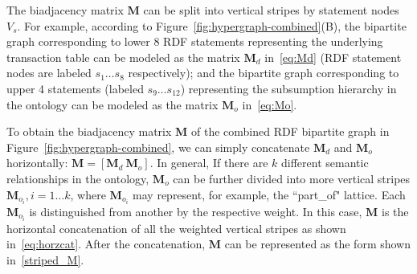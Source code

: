 The biadjacency matrix $\mathbf{M}$ can be split into vertical stripes by statement nodes $V_s$. For example, according to Figure~\ref{fig:hypergraph-combined}(B), the bipartite graph corresponding to lower 8 RDF statements representing the underlying transaction table can be modeled as the matrix $\mathbf{M}_d$ in~\ref{eq:Md} (RDF statement nodes are labeled $s_1\dots s_8$ respectively); and the bipartite graph corresponding to upper 4 statements (labeled $s_9\dots s_{12}$) representing the subsumption hierarchy in the ontology can be modeled as the matrix $\mathbf{M}_o$ in~\ref{eq:Mo}.

To obtain the biadjacency matrix $\mathbf{M}$ of the combined RDF bipartite graph in Figure~\ref{fig:hypergraph-combined}, we can simply concatenate $\mathbf{M}_d$ and $\mathbf{M}_o$ horizontally: $\mathbf{M}=\left[\mathbf{M}_d~\mathbf{M}_o\right]$. In general, If there are $k$ different semantic relationships in the ontology, $\mathbf{M}_o$ can be further divided into more vertical stripes $\mathbf{M}_{o_i}, i=1\dots k$, where $\mathbf{M}_{o_i}$ may represent, for example, the ``part\_of" lattice. Each $\mathbf{M}_{o_i}$ is  distinguished from another by the respective weight. In this case, $\mathbf{M}$ is the horizontal concatenation of all the weighted vertical stripes as shown in~\ref{eq:horzcat}. After the concatenation, $\mathbf{M}$ can be represented as the form shown in~\ref{striped_M}.

